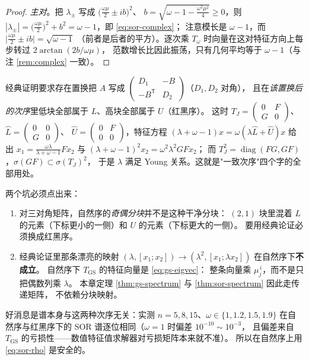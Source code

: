 \begin{proof}
\emph{主对}。把 $\lambda_\pm$ 写成 $\bigl(\frac{\omega\mu}{2}\pm ib\bigr)^2$、
$b=\sqrt{\omega-1-\frac{\omega^2\mu^2}{4}}\ge0$，则
$|\lambda_\pm|=\bigl(\frac{\omega\mu}{2}\bigr)^2+b^2=\omega-1$，即 \eqref{eq:sor-complex}；
注意模长是 $\omega-1$，而 $\bigl|\frac{\omega\mu}{2}\pm ib\bigr|=\sqrt{\omega-1}$
（前者是后者的平方）。逐次乘 $T_\omega$ 时向量在这对特征方向上每步转过 $2\arctan(2b/\omega\mu)$，
范数增长比因此振荡，只有几何平均等于 $\omega-1$（与注 \ref{rem:complex} 一致）。
\end{proof}

\begin{remark}
\label{rem:consistent}
经典证明要求存在置换把 $A$ 写成
$\begin{pmatrix}D_1&-B\\-B^{\mathsf T}&D_2\end{pmatrix}$（$D_1,D_2$ 对角），
且在\emph{该置换后的次序}里低块全部属于 $L$、高块全部属于 $U$（红黑序）。
这时 $T_J=\begin{pmatrix}0&F\\G&0\end{pmatrix}$、
$\hat L=\begin{pmatrix}0&0\\G&0\end{pmatrix}$、
$\hat U=\begin{pmatrix}0&F\\0&0\end{pmatrix}$，特征方程
$(\lambda+\omega-1)x=\omega(\lambda\hat L+\hat U)x$ 给出
$x_1=\frac{\omega\lambda}{\lambda+\omega-1}Fx_2$ 与
$(\lambda+\omega-1)^2x_2=\omega^2\lambda^2GFx_2$；
而 $T_J^2=\operatorname{diag}(FG,GF)$，$\sigma(GF)\subset\sigma(T_J)^2$，
于是 $\lambda$ 满足 Young 关系。这就是"一致次序"四个字的全部用处。

两个坑必须点出来：
\begin{enumerate}
  \item 对三对角矩阵，自然序的\emph{奇偶分块}并不是这种干净分块：
        $(2,1)$ 块里混着 $L$ 的元素（下标更小的一侧）和 $U$ 的元素（下标更大的一侧）。
        要用经典论证必须换成红黑序。
  \item 经典论证里那条漂亮的映射
        $(\lambda,[x_1;x_2])\to(\lambda^2,[x_1;\lambda x_2])$ 在自然序下\textbf{不成立}。
        自然序下 $T_{\mathrm{GS}}$ 的特征向量是 \eqref{eq:gs-eigvec}：
        整条向量乘 $\mu_j^{\,i}$，而不是只把偶数列乘 $\lambda$。
        本章定理 \ref{thm:gs-spectrum} 与 \ref{thm:sor-spectrum} 因此走传递矩阵，
        不依赖分块映射。
\end{enumerate}
好消息是谱本身与这两种次序无关：实测 $n=5,8,15$、$\omega\in\{1,1.2,1.5,1.9\}$
在自然序与红黑序下的 SOR 谱逐位相同（$\omega=1$ 时偏差 $10^{-10}\sim10^{-3}$，
且偏差来自 $T_{\mathrm{GS}}$ 的亏损性——数值特征值求解器对亏损矩阵本来就不准）。
所以在自然序上用 \eqref{eq:sor-rho} 是安全的。
\end{remark}

